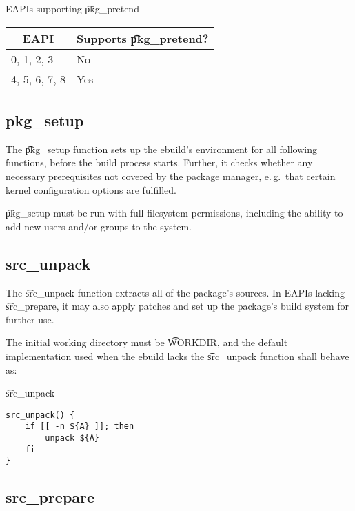 \begin{centertable}{EAPIs supporting \t{pkg_pretend}}
    \label{tab:pkg-pretend-table}
    \begin{tabular}{ll}
      \toprule
      \multicolumn{1}{c}{\textbf{EAPI}} &
      \multicolumn{1}{c}{\textbf{Supports \t{pkg_pretend}?}} \\
      \midrule
      0, 1, 2, 3        & No  \\
      4, 5, 6, 7, 8     & Yes \\
      \bottomrule
    \end{tabular}
\end{centertable}

\subsection{pkg_setup}

The \t{pkg_setup} function sets up the ebuild's environment for all following functions, before
the build process starts. Further, it checks whether any necessary prerequisites not covered
by the package manager, e.\,g.\ that certain kernel configuration options are fulfilled.

\t{pkg_setup} must be run with full filesystem permissions, including the ability to add new users
and/or groups to the system.

\subsection{src_unpack}

The \t{src_unpack} function extracts all of the package's sources. In EAPIs lacking
\t{src_prepare}, it may also apply patches and set up the package's build system for further use.

The initial working directory must be \t{WORKDIR}, and the default implementation used when
the ebuild lacks the \t{src_unpack} function shall behave as:

\begin{listing}[H]
\caption{\t{src_unpack}}
\begin{verbatim}
src_unpack() {
    if [[ -n ${A} ]]; then
        unpack ${A}
    fi
}
\end{verbatim}
\end{listing}

\subsection{src_prepare}

